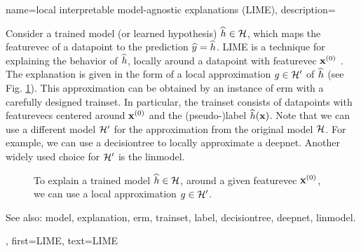 {name={local interpretable model-agnostic explanations (LIME)},
	description={Consider 
		a trained \gls{model} (or learned \gls{hypothesis}) $\widehat{h} \in \mathcal{H}$, 
		which maps the \gls{featurevec} of a \gls{datapoint} to the \gls{prediction} $\widehat{y}= \widehat{h}$. 
		LIME is a technique for explaining the behavior of $\widehat{h}$, locally around a \gls{datapoint} with \gls{featurevec} ${\bf x}^{(0)}$ \cite{Ribeiro2016}. 
		The \gls{explanation} is given in the form of a local approximation $g \in \mathcal{H}'$ of $\widehat{h}$ 
		(see Fig. \ref{fig_lime_dict}). This approximation can be obtained by an instance of \gls{erm} 
		with a carefully designed \gls{trainset}. In particular, the \gls{trainset} consists of \glspl{datapoint} with 
		\glspl{featurevec} centered around ${\bf x}^{(0)}$ and the (pseudo-)\gls{label} $\widehat{h}({\bf x})$. 
		Note that we can use a different \gls{model} $\mathcal{H}'$ for the approximation from 
		the original \gls{model} $\mathcal{H}$. For example, we can use a \gls{decisiontree} 
		to locally approximate a \gls{deepnet}. Another widely used choice for $\mathcal{H}'$ is 
		the \gls{linmodel}. 
		\begin{figure}[H]
		\begin{center}
		\end{center}
		\caption{To explain a trained \gls{model} $\widehat{h} \in \mathcal{H}$, around a 
		given \gls{featurevec} ${\bf x}^{(0)}$, we can use a local approximation $g \in \mathcal{H}'$. }
		\label{fig_lime_dict}
		\end{figure}
		See also: \gls{model}, \gls{explanation}, \gls{erm}, \gls{trainset}, \gls{label}, \gls{decisiontree}, \gls{deepnet}, \gls{linmodel}.},
	first={LIME},
	text={LIME}
}



